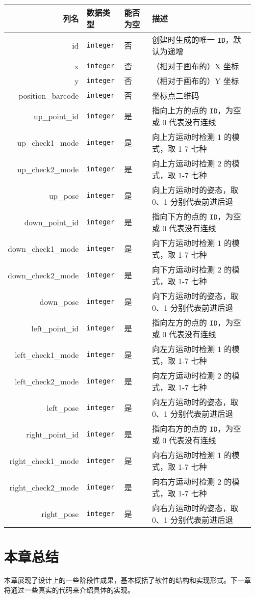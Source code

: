 \begin{longtabu}to \textwidth{rllX}
  \toprule
  列名 & 数据类型 & 能否为空 & 描述 \\
  \midrule
  \endhead
  \bottomrule
  \endfoot
  id & \texttt{integer} & 否 & 创建时生成的唯一 \texttt{ID}，默认为递增 \\
  x & \texttt{integer} & 否 & （相对于画布的）X 坐标 \\
  y & \texttt{integer} & 否 & （相对于画布的）Y 坐标 \\
  position\_barcode & \texttt{integer} & 否 & 坐标点二维码 \\
  up\_point\_id & \texttt{integer} & 是 & 指向上方的点的 \texttt{ID}，为空或 0 代表没有连线 \\
  up\_check1\_mode & \texttt{integer} & 是 & 向上方运动时检测 1 的模式，取 1-7 七种 \\
  up\_check2\_mode & \texttt{integer} & 是 & 向上方运动时检测 2 的模式，取 1-7 七种 \\
  up\_pose & \texttt{integer} & 是 & 向上方运动时的姿态，取 0、1 分别代表前进后退 \\
  down\_point\_id & \texttt{integer} & 是 & 指向下方的点的 \texttt{ID}，为空或 0 代表没有连线 \\
  down\_check1\_mode & \texttt{integer} & 是 & 向下方运动时检测 1 的模式，取 1-7 七种 \\
  down\_check2\_mode & \texttt{integer} & 是 & 向下方运动时检测 2 的模式，取 1-7 七种 \\
  down\_pose & \texttt{integer} & 是 & 向下方运动时的姿态，取 0、1 分别代表前进后退 \\
  left\_point\_id & \texttt{integer} & 是 & 指向左方的点的 \texttt{ID}，为空或 0 代表没有连线 \\
  left\_check1\_mode & \texttt{integer} & 是 & 向左方运动时检测 1 的模式，取 1-7 七种 \\
  left\_check2\_mode & \texttt{integer} & 是 & 向左方运动时检测 2 的模式，取 1-7 七种 \\
  left\_pose & \texttt{integer} & 是 & 向左方运动时的姿态，取 0、1 分别代表前进后退 \\
  right\_point\_id & \texttt{integer} & 是 & 指向右方的点的 \texttt{ID}，为空或 0 代表没有连线 \\
  right\_check1\_mode & \texttt{integer} & 是 & 向右方运动时检测 1 的模式，取 1-7 七种 \\
  right\_check2\_mode & \texttt{integer} & 是 & 向右方运动时检测 2 的模式，取 1-7 七种 \\
  right\_pose & \texttt{integer} & 是 & 向右方运动时的姿态，取 0、1 分别代表前进后退
\end{longtabu}

\section{本章总结}

本章展现了设计上的一些阶段性成果，基本概括了软件的结构和实现形式。下一章将通过一些真实的代码来介绍具体的实现。
